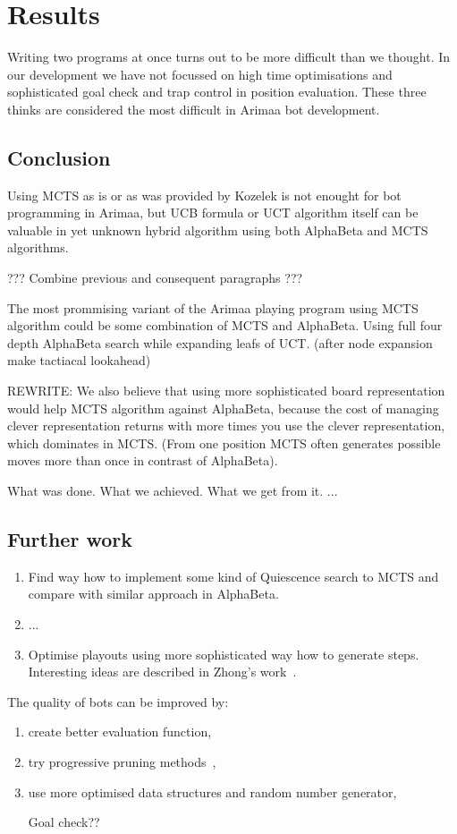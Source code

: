 
\chapter{Results}
Writing two programs at once turns out to be more difficult than we thought. In
our development we have not focussed on high time optimisations and
sophisticated goal check and trap control in position evaluation. These three
thinks are considered the most difficult in Arimaa bot development.

\section{Conclusion}
Using MCTS as is or as was provided by Kozelek is not enought for bot
programming in Arimaa, but UCB formula or UCT algorithm itself can be valuable
in yet unknown hybrid algorithm using both AlphaBeta and MCTS algorithms.

??? Combine previous and consequent paragraphs ???

The most prommising variant of the Arimaa playing program using MCTS algorithm
could be some combination of MCTS and AlphaBeta. Using full four depth
AlphaBeta search while expanding leafs of UCT. (after node expansion make
tactiacal lookahead)

REWRITE: We also believe that using more sophisticated board representation
would help MCTS algorithm against AlphaBeta, because the cost of managing
clever representation returns with more times you use the clever
representation, which dominates in MCTS. (From one position MCTS often
generates possible moves more than once in contrast of AlphaBeta).

What was done. What we achieved. What we get from it. ...

\section{Further work}

\begin{enumerate}
\item Find way how to implement some kind of Quiescence search to MCTS and compare with similar approach in AlphaBeta.
\item ...
\item Optimise playouts using more sophisticated way how to generate steps. Interesting ideas are described in Zhong's work~\cite{ZHONG}.
\end{enumerate}

The quality of bots can be improved by:
\begin{enumerate}
\item create better evaluation function,
\item try progressive pruning  methods~\cite{progressive-strategies,
MonteCarloGo},
\item use more optimised data structures and random number generator,

Goal check??

\end{enumerate}
